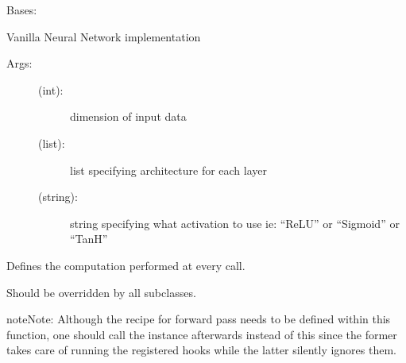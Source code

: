 \documentclass[letterpaper,10pt,english,openany,oneside]{sphinxmanual}
\begin{document}

\begin{fulllineitems}
\label{\detokenize{stl:methods.regressor.FFNN.NN}}
Bases: 

Vanilla Neural Network implementation
\begin{description}
\item[{Args:}] \leavevmode\begin{description}
\item[{ (int): }] \leavevmode
dimension of input data

\item[{ (list):}] \leavevmode
list specifying architecture for each layer

\item[{ (string):}] \leavevmode
string specifying what activation to use ie: “ReLU” or “Sigmoid” or “TanH”

\end{description}

\end{description}

\begin{fulllineitems}
\label{\detokenize{stl:methods.regressor.FFNN.NN.forward}}
Defines the computation performed at every call.

Should be overridden by all subclasses.

\begin{sphinxadmonition}{note}{Note:}
Although the recipe for forward pass needs to be defined within
this function, one should call the  instance afterwards
instead of this since the former takes care of running the
registered hooks while the latter silently ignores them.
\end{sphinxadmonition}

\end{fulllineitems}


\end{fulllineitems}
\end{document}
